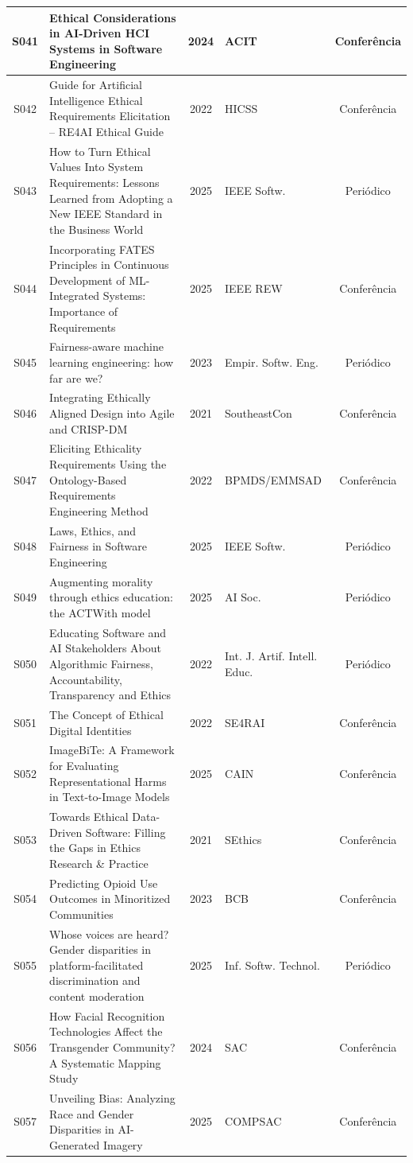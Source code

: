 \begin{longtable}{|c|p{7cm}|c|p{3.5cm}|c|}
S041 & Ethical Considerations in AI-Driven HCI Systems in Software Engineering & 2024 & ACIT & Conferência \\ \hline
S042 & Guide for Artificial Intelligence Ethical Requirements Elicitation -- RE4AI Ethical Guide & 2022 & HICSS & Conferência \\ \hline
S043 & How to Turn Ethical Values Into System Requirements: Lessons Learned from Adopting a New IEEE Standard in the Business World & 2025 & IEEE Softw. & Periódico \\ \hline
S044 & Incorporating FATES Principles in Continuous Development of ML-Integrated Systems: Importance of Requirements & 2025 & IEEE REW & Conferência \\ \hline
S045 & Fairness-aware machine learning engineering: how far are we? & 2023 & Empir. Softw. Eng. & Periódico \\ \hline
S046 & Integrating Ethically Aligned Design into Agile and CRISP-DM & 2021 & SoutheastCon & Conferência \\ \hline
S047 & Eliciting Ethicality Requirements Using the Ontology-Based Requirements Engineering Method & 2022 & BPMDS/EMMSAD & Conferência \\ \hline
S048 & Laws, Ethics, and Fairness in Software Engineering & 2025 & IEEE Softw. & Periódico \\ \hline
S049 & Augmenting morality through ethics education: the ACTWith model & 2025 & AI Soc. & Periódico \\ \hline
S050 & Educating Software and AI Stakeholders About Algorithmic Fairness, Accountability, Transparency and Ethics & 2022 & Int. J. Artif. Intell. Educ. & Periódico \\ \hline
S051 & The Concept of Ethical Digital Identities & 2022 & SE4RAI & Conferência \\ \hline
S052 & ImageBiTe: A Framework for Evaluating Representational Harms in Text-to-Image Models & 2025 & CAIN & Conferência \\ \hline
S053 & Towards Ethical Data-Driven Software: Filling the Gaps in Ethics Research \& Practice & 2021 & SEthics & Conferência \\ \hline
S054 & Predicting Opioid Use Outcomes in Minoritized Communities & 2023 & BCB & Conferência \\ \hline
S055 & Whose voices are heard? Gender disparities in platform-facilitated discrimination and content moderation & 2025 & Inf. Softw. Technol. & Periódico \\ \hline
S056 & How Facial Recognition Technologies Affect the Transgender Community? A Systematic Mapping Study & 2024 & SAC & Conferência \\ \hline
S057 & Unveiling Bias: Analyzing Race and Gender Disparities in AI-Generated Imagery & 2025 & COMPSAC & Conferência \\ \hline
\end{longtable}


